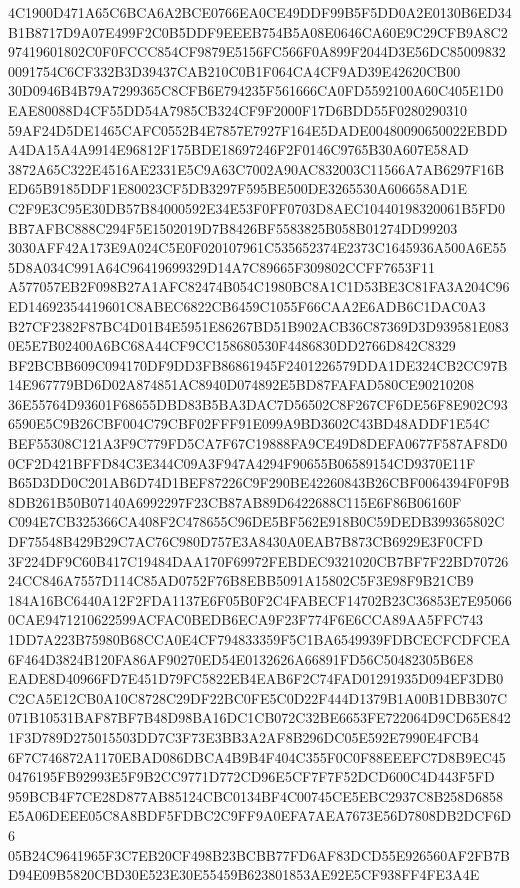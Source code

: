 \documentclass[UTF8,fontset=fandol,zihao=-4,a4paper]{ctexart}
\begin{document}
{{4C1900D471A65C6BCA6A2BCE0766EA0CE49DDF99B5F5DD0A2E0130B6ED34B1B8717D9A07E499F2C0B5DDF9EEEB754B5A08E0646CA60E9C29CFB9A8C2
97419601802C0F0FCCC854CF9879E5156FC566F0A899F2044D3E56DC850098320091754C6CF332B3D39437CAB210C0B1F064CA4CF9AD39E42620CB00
30D0946B4B79A7299365C8CFB6E794235F561666CA0FD5592100A60C405E1D0EAE80088D4CF55DD54A7985CB324CF9F2000F17D6BDD55F0280290310
59AF24D5DE1465CAFC0552B4E7857E7927F164E5DADE00480090650022EBDDA4DA15A4A9914E96812F175BDE18697246F2F0146C9765B30A607E58AD
3872A65C322E4516AE2331E5C9A63C7002A90AC832003C11566A7AB6297F16BED65B9185DDF1E80023CF5DB3297F595BE500DE3265530A606658AD1E
C2F9E3C95E30DB57B84000592E34E53F0FF0703D8AEC10440198320061B5FD0BB7AFBC888C294F5E1502019D7B8426BF5583825B058B01274DD99203
3030AFF42A173E9A024C5E0F020107961C535652374E2373C1645936A500A6E555D8A034C991A64C96419699329D14A7C89665F309802CCFF7653F11
A577057EB2F098B27A1AFC82474B054C1980BC8A1C1D53BE3C81FA3A204C96ED14692354419601C8ABEC6822CB6459C1055F66CAA2E6ADB6C1DAC0A3
B27CF2382F87BC4D01B4E5951E86267BD51B902ACB36C87369D3D939581E0830E5E7B02400A6BC68A44CF9CC158680530F4486830DD2766D842C8329
BF2BCBB609C094170DF9DD3FB86861945F2401226579DDA1DE324CB2CC97B14E967779BD6D02A874851AC8940D074892E5BD87FAFAD580CE90210208
36E55764D93601F68655DBD83B5BA3DAC7D56502C8F267CF6DE56F8E902C936590E5C9B26CBF004C79CBF02FFF91E099A9BD3602C43BD48ADDF1E54C
BEF55308C121A3F9C779FD5CA7F67C19888FA9CE49D8DEFA0677F587AF8D00CF2D421BFFD84C3E344C09A3F947A4294F90655B06589154CD9370E11F
B65D3DD0C201AB6D74D1BEF87226C9F290BE42260843B26CBF0064394F0F9B8DB261B50B07140A6992297F23CB87AB89D6422688C115E6F86B06160F
C094E7CB325366CA408F2C478655C96DE5BF562E918B0C59DEDB399365802CDF75548B429B29C7AC76C980D757E3A8430A0EAB7B873CB6929E3F0CFD
3F224DF9C60B417C19484DAA170F69972FEBDEC9321020CB7BF7F22BD7072624CC846A7557D114C85AD0752F76B8EBB5091A15802C5F3E98F9B21CB9
184A16BC6440A12F2FDA1137E6F05B0F2C4FABECF14702B23C36853E7E950660CAE9471210622599ACFAC0BEDB6ECA9F23F774F6E6CCA89AA5FFC743
1DD7A223B75980B68CCA0E4CF794833359F5C1BA6549939FDBCECFCDFCEA6F464D3824B120FA86AF90270ED54E0132626A66891FD56C50482305B6E8
EADE8D40966FD7E451D79FC5822EB4EAB6F2C74FAD01291935D094EF3DB0C2CA5E12CB0A10C8728C29DF22BC0FE5C0D22F444D1379B1A00B1DBB307C
071B10531BAF87BF7B48D98BA16DC1CB072C32BE6653FE722064D9CD65E8421F3D789D275015503DD7C3F73E3BB3A2AF8B296DC05E592E7990E4FCB4
6F7C746872A1170EBAD086DBCA4B9B4F404C355F0C0F88EEEFC7D8B9EC450476195FB92993E5F9B2CC9771D772CD96E5CF7F7F52DCD600C4D443F5FD
959BCB4F7CE28D877AB85124CBC0134BF4C00745CE5EBC2937C8B258D6858E5A06DEEE05C8A8BDF5FDBC2C9FF9A0EFA7AEA7673E56D7808DB2DCF6D6
05B24C9641965F3C7EB20CF498B23BCBB77FD6AF83DCD55E926560AF2FB7BD94E09B5820CBD30E523E30E55459B623801853AE92E5CF938FF4FE3A4E
}}
\end{document}
